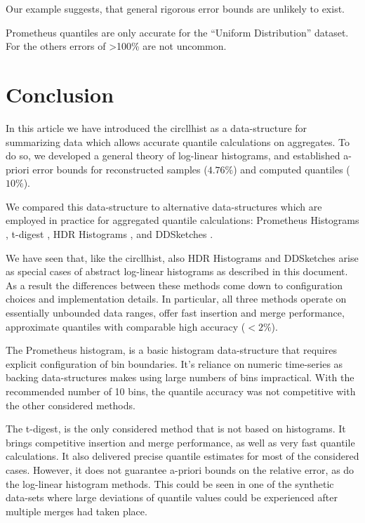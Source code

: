 \documentclass{article}
\theoremstyle{plain}
\theoremstyle{remark}
\begin{document}
Our example suggests, that general rigorous error bounds are unlikely to exist.

Prometheus quantiles are only accurate for the ``Uniform Distribution'' dataset.
For the others errors of >100\% are not uncommon.

\section{Conclusion}

In this article we have introduced the circllhist as a data-structure for summarizing data which
allows accurate quantile calculations on aggregates.  To do so, we developed a general theory of
log-linear histograms, and established a-priori error bounds for reconstructed samples ($4.76\%$)
and computed quantiles ($10\%$).

We compared this data-structure to alternative data-structures which are employed in practice for
aggregated quantile calculations: Prometheus Histograms \cite{prom}, t-digest \cite{tdigest}, HDR
Histograms \cite{hdr}, and DDSketches \cite{dd}.

We have seen that, like the circllhist, also HDR Histograms and DDSketches arise as special cases of
abstract log-linear histograms as described in this document. As a result the differences between
these methods come down to configuration choices and implementation details.  In particular, all
three methods operate on essentially unbounded data ranges, offer fast insertion and merge
performance, approximate quantiles with comparable high accuracy ($<2\%$).

The Prometheus histogram, is a basic histogram data-structure that requires explicit configuration
of bin boundaries. It's reliance on numeric time-series as backing data-structures makes using large
numbers of bins impractical. With the recommended number of 10 bins, the quantile accuracy was not
competitive with the other considered methods.

The t-digest, is the only considered method that is not based on histograms. It brings competitive
insertion and merge performance, as well as very fast quantile calculations. It also delivered
precise quantile estimates for most of the considered cases. However, it does not guarantee a-priori
bounds on the relative error, as do the log-linear histogram methods. This could be seen in one of
the synthetic data-sets where large deviations of quantile values could be experienced after
multiple merges had taken place.
\end{document}
